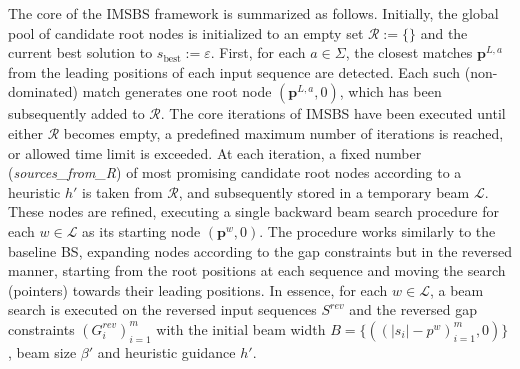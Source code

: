 \documentclass[runningheads]{llncs}
\begin{document}
	The core of the IMSBS framework is summarized as follows. %
	Initially, the global pool of candidate root nodes is initialized to an empty set $\mathcal{R}:=\{\}$ and the current best solution to $s_{\mathrm{best}}:= \varepsilon$. First, for each $a \in \Sigma$, the closest matches $\mathbf{p}^{L, a}$ from the leading positions of each input sequence are detected. Each such (non-dominated) match generates one root node $(\mathbf{p}^{L, a}, 0)$, which has been subsequently added to $\mathcal{R}$.  The core iterations of IMSBS have been executed until either  $\mathcal{R}$ becomes empty, a predefined maximum number of iterations is reached, or allowed time limit is exceeded. At each iteration, a fixed number (\emph{sources\_from\_R}) of most promising candidate root nodes according to a heuristic $h'$ is taken from $\mathcal{R}$, and subsequently stored in a temporary beam $\mathcal{L}$.  These nodes are refined, executing a single backward beam search procedure for each $w \in \mathcal{L}$ as its starting node $(\mathbf{p}^w, 0)$. The procedure works similarly to the baseline BS,  expanding nodes according to the gap constraints but in the reversed manner, starting from the root positions at each sequence and moving the search (pointers) towards their leading positions. In essence, for each $w \in \mathcal{L}$, a beam search  %
	is executed on the reversed input sequences $S^{rev}$ and the reversed gap constraints $(G_i^{rev})_{i=1}^m$ with the initial beam width $B=\{ ((|s_i|-p^w)_{i=1}^m, 0) \}$, beam size $\beta'$ and heuristic guidance $h'$.   %
\end{document}
